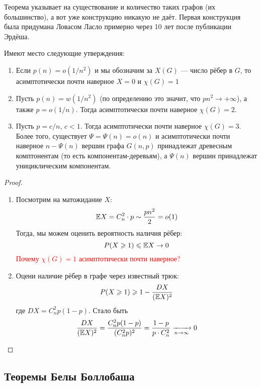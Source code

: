 \begin{note}
	Теорема указывает на существование и количество таких графов (их большинство), а вот уже конструкцию никакую не даёт. Первая конструкция была придумана Ловасом Ласло примерно через 10 лет после публикации Эрдёша.
\end{note}

\begin{proposition}
	Имеют место следующие утверждения:
	\begin{enumerate}
		\item Если $p(n) = o(1 / n^2)$ и мы обозначим за $X(G)$ --- число рёбер в $G$, то асимптотически почти наверное $X = 0$ и $\chi(G) = 1$
		
		\item Пусть $p(n) = w(1 / n^2)$ (по определению это значит, что $pn^2 \to +\infty$), а также $p = o(1 / n)$. Тогда асимптотически почти наверное $\chi(G) = 2$.
		
		\item Пусть $p = c / n$, $c < 1$. Тогда асимптотически почти наверное $\chi(G) = 3$. Более того, существует $\Psi = \Psi(n) = o(n)$ и асимптотически почти наверное $n - \Psi(n)$ вершин графа $G(n, p)$ принадлежат древесным комптонентам (то есть компонентам-деревьям), а $\Psi(n)$ вершин принадлежат унициклическим компонентам.
	\end{enumerate}
\end{proposition}

\begin{proof}~
	\begin{enumerate}
		\item Посмотрим на матожидание $X$:
		\[
			\mathbb{E} X = C_n^2 \cdot p \sim \frac{pn^2}{2} = o(1)
		\]
		Тогда, мы можем оценить вероятность наличия рёбер:
		\[
			P(X \geqslant 1) \leqslant \mathbb{E} X \to 0
		\]
		\textcolor{red}{Почему $\chi(G) = 1$ асимптотически почти наверное?}
		
		\item Оцени наличие рёбер в графе через известный трюк:
		\[
			P(X \geqslant 1) \geqslant 1 - \frac{DX}{(\mathbb{E} X)^2}
		\]
		где $DX = C_n^2 p(1 - p)$. Стало быть
		\[
			\frac{DX}{(\mathbb{E} X)^2} = \frac{C_n^2 p(1 - p)}{(C_n^2 p)^2} = \frac{1 - p}{p \cdot C_n^2} \xrightarrow[n \to \infty]{} 0
		\]
	\end{enumerate}
\end{proof}

\subsection{Теоремы Белы Боллобаша}

